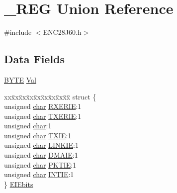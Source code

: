 \hypertarget{union___r_e_g}{}\section{\+\_\+\+R\+E\+G Union Reference}
\label{union___r_e_g}


{\ttfamily \#include $<$E\+N\+C28\+J60.\+h$>$}

\subsection*{Data Fields}
\begin{DoxyCompactItemize}
\item 
\hyperlink{_generic_type_defs_8h_a4ae1dab0fb4b072a66584546209e7d58}{B\+Y\+T\+E} \hyperlink{union___r_e_g_a5ab8c2bf45b20b5f7aa3a4f083896cec}{Val}
\item 
\begin{tabbing}
xx\=xx\=xx\=xx\=xx\=xx\=xx\=xx\=xx\=\kill
struct \{\\
\>unsigned \hyperlink{union___r_e_g_afe71f11dacb15682cdc012f7208e6e09}{char} \hyperlink{union___r_e_g_ab062efc1f39c9ffdcfed97960885aca0}{RXERIE}:1\\
\>unsigned \hyperlink{union___r_e_g_afe71f11dacb15682cdc012f7208e6e09}{char} \hyperlink{union___r_e_g_a67263429abcf3d30708255e69c711789}{TXERIE}:1\\
\>unsigned \hyperlink{union___r_e_g_afe71f11dacb15682cdc012f7208e6e09}{char}:1\\
\>unsigned \hyperlink{union___r_e_g_afe71f11dacb15682cdc012f7208e6e09}{char} \hyperlink{union___r_e_g_a80fc4693b19aa4a89d281b2398660b6b}{TXIE}:1\\
\>unsigned \hyperlink{union___r_e_g_afe71f11dacb15682cdc012f7208e6e09}{char} \hyperlink{union___r_e_g_a4cc25f0ba5bcb4ac6ff1bd68769b4c8f}{LINKIE}:1\\
\>unsigned \hyperlink{union___r_e_g_afe71f11dacb15682cdc012f7208e6e09}{char} \hyperlink{union___r_e_g_a2142efc9e327e82959c1ddedb5faa96f}{DMAIE}:1\\
\>unsigned \hyperlink{union___r_e_g_afe71f11dacb15682cdc012f7208e6e09}{char} \hyperlink{union___r_e_g_a31f7570f8bbd4fa988a4d9926934f47b}{PKTIE}:1\\
\>unsigned \hyperlink{union___r_e_g_afe71f11dacb15682cdc012f7208e6e09}{char} \hyperlink{union___r_e_g_a45d1c2f88674913abceb675882362d3e}{INTIE}:1\\
\} \hyperlink{union___r_e_g_a60995221621a04f17a73df799ad8ebc7}{EIEbits}\\


\end{tabbing}
\end{DoxyCompactItemize}
